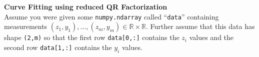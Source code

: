 \textbf{Curve Fitting using reduced QR Factorization}\\

Assume you were given some \verb|numpy.ndarray| called ``\verb|data|'' containing measurements $(z_1,y_1),\ldots, (z_m,y_m) \in \mathbb{R}\times\mathbb{R}$. Further assume that this data has shape \verb|(2,m)| so that the first row \verb|data[0,:]| contains the $z_i$ values and the second row \verb|data[1,:]| contains the $y_i$ values.\\
